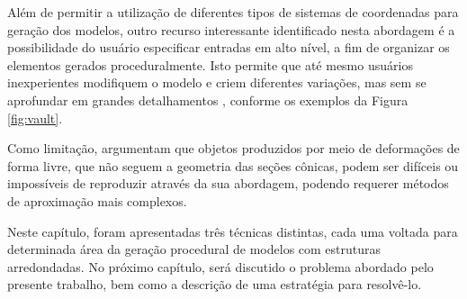 Além de permitir a utilização de diferentes tipos de sistemas de coordenadas para geração dos modelos, outro recurso interessante identificado nesta abordagem é a possibilidade do usuário especificar entradas em alto nível, a fim de organizar os elementos gerados proceduralmente. Isto permite que até mesmo usuários inexperientes modifiquem o modelo e criem diferentes variações, mas sem se aprofundar em grandes detalhamentos \cite{edelsbrunner2017}, conforme os exemplos da Figura \ref{fig:vault}.

\begin{figure}[h!]
	\centering
	\captionsetup{width=15cm}
	{}	
\end{figure}

Como limitação,  argumentam que objetos produzidos por meio de deformações de forma livre, que não seguem a geometria das seções cônicas, podem ser difíceis ou impossíveis de reproduzir através da sua abordagem, podendo requerer métodos de aproximação mais complexos.

\vspace{1cm}

Neste capítulo, foram apresentadas três técnicas distintas, cada uma voltada para determinada área da geração procedural de modelos com estruturas arredondadas. No próximo capítulo, será discutido o problema abordado pelo presente trabalho, bem como a descrição de uma estratégia para resolvê-lo.
 